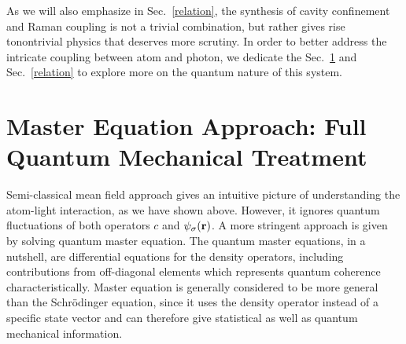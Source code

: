 \documentclass[atoms,article,submit,moreauthors,pdftex,12pt,a4paper]{mdpi}
\begin{document}

As we will also emphasize in Sec.~\ref{relation}, the synthesis of cavity confinement and Raman coupling is not a trivial combination, but rather gives rise tonontrivial physics that deserves more scrutiny. In order to better address the intricate coupling between atom and photon, we dedicate the Sec.~\ref{master} and Sec.~\ref{relation} to explore more on the quantum nature of this system. 

\section{Master Equation Approach: Full Quantum Mechanical Treatment } \label{master}

Semi-classical mean field approach gives an intuitive picture of understanding the atom-light interaction, as we have shown above. However, it ignores quantum fluctuations of both operators $c$ and $\psi_\sigma({\bf r})$. A more stringent approach is given by solving quantum master equation.
The quantum master equations, in a nutshell, are differential equations for the density operators, including contributions from off-diagonal elements which represents quantum coherence characteristically.
Master equation is generally considered to be more general than the Schr\"{o}dinger equation, since it uses the density operator instead of a specific state vector and can therefore give statistical as well as quantum mechanical information. 
\end{document}
